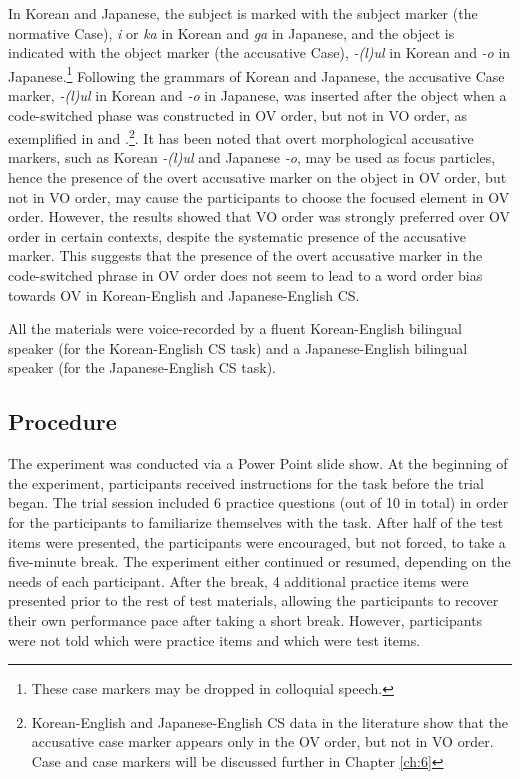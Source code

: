 In Korean and Japanese, the subject is marked with the subject marker (the normative Case), \textit{i} or \textit{ka} in Korean and \textit{ga} in Japanese, and the object is indicated with the object marker (the accusative Case), \textit{{}-(l)ul} in Korean and \textit{{}-o} in Japanese.\footnote{\textrm{These case markers may be dropped in colloquial speech.}} Following the grammars of Korean and Japanese, the accusative Case marker, \textit{{}-(l)ul} in Korean and \textit{{}-o} in Japanese, was inserted after the object when a code-switched phase was constructed in \ac{OV} order, but not in \ac{VO} order, as exemplified in  and .\footnote{Korean-English and Japanese-English \ac{CS} data in the literature show that the accusative case marker appears only in the \ac{OV} order, but not in \ac{VO} order. Case and case markers will be discussed further in Chapter \ref{ch:6}}. It has been noted that overt morphological accusative markers, such as Korean \textit{{}-(l)ul} and Japanese \textit{{}-o}, may be used as focus particles, hence the presence of the overt accusative marker on the object in \ac{OV} order, but not in \ac{VO} order, may cause the participants to choose the focused element in \ac{OV} order. However, the results showed that \ac{VO} order was strongly preferred over \ac{OV} order in certain contexts, despite the systematic presence of the accusative marker. This suggests that the presence of the overt accusative marker in the code-switched phrase in \ac{OV} order does not seem to lead to a word order bias towards \ac{OV} in Korean-English and Japanese-English \ac{CS}. 

All the materials were voice-recorded by a fluent Korean-English bilingual speaker (for the Korean-English \ac{CS} task) and a Japanese-English bilingual speaker (for the Japanese-English \ac{CS} task). 

\subsection{Procedure}\label{ch2:sect:2.1.3}

The experiment was conducted via a Power Point slide show. At the beginning of the experiment, participants received instructions for the task before the trial began. The trial session included 6 practice questions (out of 10 in total) in order for the participants to familiarize themselves with the task. After half of the test items were presented, the participants were encouraged, but not forced, to take a five-minute break. The experiment either continued or resumed, depending on the needs of each participant. After the break, 4 additional practice items were presented prior to the rest of test materials, allowing the participants to recover their own performance pace after taking a short break. However, participants were not told which were practice items and which were test items.


